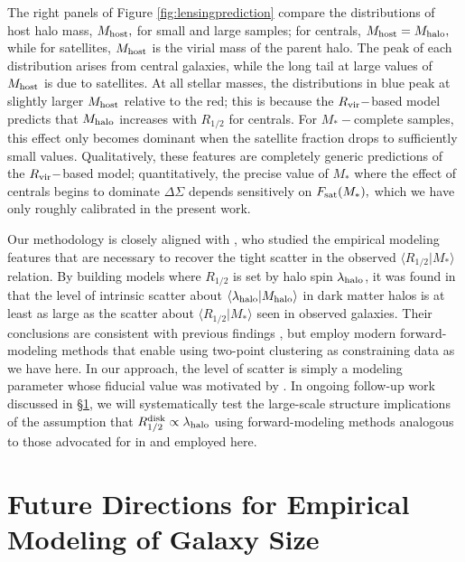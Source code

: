 \documentclass[usenatbib,usegraphicx,letterpaper]{mn2e}
\newcommand{\rhalf}{R_{1/2}}
\newcommand{\mstar}{M_{\ast}}
\newcommand{\mhalo}{M_{\rm halo}}
\newcommand{\mhost}{M_{\rm host}}
\newcommand{\rvir}{R_{\rm vir}}
\newcommand{\mean}[2]{\langle{#1}\vert{#2}\rangle}
\begin{document}
The right panels of Figure \ref{fig:lensingprediction} compare the distributions of host halo mass, $\mhost,$ for small and large samples; for centrals, $\mhost=\mhalo,$ while for satellites, $\mhost$ is the virial mass of the parent halo. The peak of each distribution arises from central galaxies, while the long tail at large values of $\mhost$ is due to satellites. At all stellar masses, the distributions in blue peak at slightly larger $\mhost$ relative to the red; this is because the $\rvir-$based model predicts that $\mhalo$ increases with $\rhalf$ for centrals. For $\mstar-$complete samples, this effect only becomes dominant when the satellite fraction drops to sufficiently small values. Qualitatively, these features are completely generic predictions of the $\rvir-$based model; quantitatively, the precise value of $\mstar$ where the effect of centrals begins to dominate $\Delta\Sigma$ depends sensitively on $F_{\rm sat}(\mstar),$ which we have only roughly calibrated in the present work. 

Our methodology is closely aligned with \citet{somerville_etal17}, who studied the empirical modeling features that are necessary to recover the tight scatter in the observed $\mean{\rhalf}{\mstar}$ relation. By building models where $\rhalf$ is set by halo spin $\lambda_{\rm halo}$, it was found in \citet{somerville_etal17} that the level of intrinsic scatter about $\langle\lambda_{\rm halo}\vert\mhalo\rangle$ in dark matter halos is at least as large as the scatter about $\langle\rhalf\vert\mstar\rangle$ seen in observed galaxies. Their conclusions are consistent with previous findings \citep[e.g.,][]{dejong_lacey00, gnedin_etal07}, but employ modern forward-modeling methods that enable using two-point clustering as constraining data as we have here. In our approach, the level of scatter is simply a modeling parameter whose fiducial value was motivated by \citet{somerville_etal17}. In ongoing follow-up work discussed in \S\ref{sec:future}, we will systematically test the large-scale structure implications of the assumption that $\rhalf^{\rm disk}\propto\lambda_{\rm halo}$ using forward-modeling methods analogous to those advocated for in \citet{somerville_etal17} and employed here.

\section{Future Directions for Empirical Modeling of Galaxy Size}
\label{sec:future}
\end{document}
